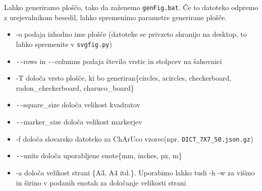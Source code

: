 Lahko generiramo ploščo, tako da zaženemo \texttt{genFig.bat}. Če to datoteko odpremo z urejevalnikom besedil, lahko spremenimo parametre generirane plošče. \cite{patterntut}
\begin{itemize}
    \sloppy
    \item -o podaja izhodno ime plošče (datoteke se privzeto shranijo na desktop, to lahko spremenite v \texttt{svgfig.py})

    \item \verb|--|rows in \verb|--|columns podaja število vrstic in stolpcev na šahovnici

    \item -T določa vrsto plošče, ki bo generiran\{circles, acircles, checkerboard, radon\_checkerboard, charuco\_board\}

    \item \verb|--|square\_size določa velikost kvadratov

    \item \verb|--|marker\_size določa velikost markerjev

    \item -f določa slovarsko datoteko za ChArUco vzorec(npr. \texttt{DICT\_7X7\_50.json.gz})

    \item \verb|--|units določa uporabljene enote\{mm, inches, px, m\}

    \item -a določa velikost strani \{A3, A4 itd.\}. Uporabimo lahko tudi -h -w za višino in širino v podanih enotah za določanje velikosti strani
    
\end{itemize}